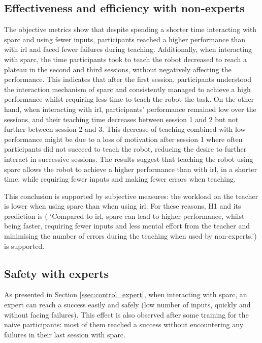 \subsection{Effectiveness and efficiency with non-experts}
The objective metrics show that despite spending a shorter time interacting with \gls{sparc} and using fewer inputs, participants reached a higher performance than with \gls{irl} and faced fewer failures during teaching. Additionally, when interacting with \gls{sparc}, the time participants took to teach the robot decreased to reach a plateau in the second and third sessions, without negatively affecting the performance. This indicates that after the first session, participants understood the interaction mechanism of \gls{sparc} and consistently managed to achieve a high performance whilst requiring less time to teach the robot the task. On the other hand, when interacting with \gls{irl}, participants' performance remained low over the sessions, and their teaching time decreases between session 1 and 2 but not further between session 2 and 3. This decrease of teaching combined with low performance might be due to a loss of motivation after session 1 where often participants did not succeed to teach the robot, reducing the desire to further interact in successive sessions. The results suggest that teaching the robot using \gls{sparc} allows the robot to achieve a higher performance than with \gls{irl}, in a shorter time, while requiring fewer inputs and making fewer errors when teaching. 

This conclusion is supported by subjective measures: the workload on the teacher is lower when using \gls{sparc} than when using \gls{irl}. For these reasons, H1 and its prediction is ( `Compared to \gls{irl}, \gls{sparc} can lead to higher performance, whilst being faster, requiring fewer inputs and less mental effort from the teacher and minimising the number of errors during the teaching when used by non-experts.') is supported.

\subsection{Safety with experts}

As presented in Section \ref{ssec:control_expert}, when interacting with \gls{sparc}, an expert can reach a success easily and safely (low number of inputs, quickly and without facing failures). This effect is also observed after some training for the naive participants: most of them reached a success without encountering any failures in their last session with \gls{sparc}.

